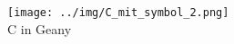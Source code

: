 \begin{frame}
	\begin{figure}
		\texttt{[image: ../img/C\_mit\_symbol\_2.png]}\\
		\tiny C in Geany
	\end{figure}
\end{frame}
